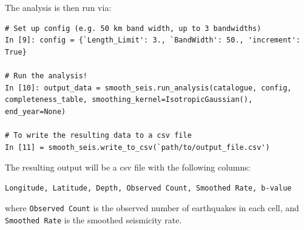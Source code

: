 The analysis is then run via:

\begin{Verbatim}[frame=single, commandchars=\\\{\}, fontsize=\scriptsize]
# Set up config (e.g. 50 km band width, up to 3 bandwidths)
In [9]: config = {`Length_Limit': 3., `BandWidth': 50., 'increment': True}

# Run the analysis!
In [10]: output_data = smooth_seis.run_analysis(catalogue, config, completeness_table, smoothing_kernel=IsotropicGaussian(), end_year=None)

# To write the resulting data to a csv file
In [11] = smooth_seis.write_to_csv(`path/to/output_file.csv')
\end{Verbatim}

The resulting output will be a csv file with the following columns:
\begin{Verbatim}[frame=single, commandchars=\\\{\}, fontsize=\scriptsize]
Longitude, Latitude, Depth, Observed Count, Smoothed Rate, b-value
\end{Verbatim}

\noindent where \verb=Observed Count= is the observed number of earthquakes in each cell, and \\ 
\verb=Smoothed Rate= is the smoothed seismicity rate.







